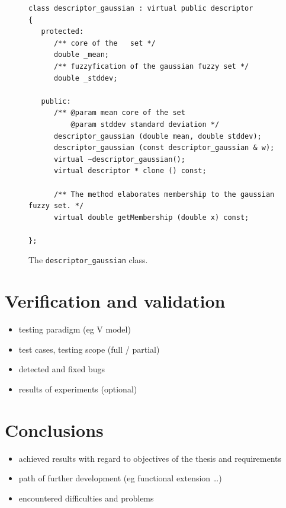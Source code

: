 \documentclass[a4paper,twoside,12pt]{book}
\begin{document}
\begin{figure}
\centering
\begin{lstlisting}
class descriptor_gaussian : virtual public descriptor
{
   protected:
      /** core of the   set */
      double _mean;
      /** fuzzyfication of the gaussian fuzzy set */
      double _stddev;
      
   public:
      /** @param mean core of the set
          @param stddev standard deviation */
      descriptor_gaussian (double mean, double stddev);
      descriptor_gaussian (const descriptor_gaussian & w);
      virtual ~descriptor_gaussian();
      virtual descriptor * clone () const;
      
      /** The method elaborates membership to the gaussian fuzzy set. */
      virtual double getMembership (double x) const;
     
};
\end{lstlisting}
\caption{The \lstinline|descriptor_gaussian| class.}
\label{fig:pseudokod}
\end{figure}


\chapter{Verification and validation}
\begin{itemize}
\item testing paradigm (eg V model)
\item test cases, testing scope (full / partial)
\item detected and fixed bugs
\item results of experiments (optional)
\end{itemize}

 
 

\chapter{Conclusions}



\begin{itemize}
\item achieved results with regard to objectives of the thesis and requirements
\item path of further development (eg functional extension …)
\item encountered difficulties and problems
\end{itemize}
\end{document}
